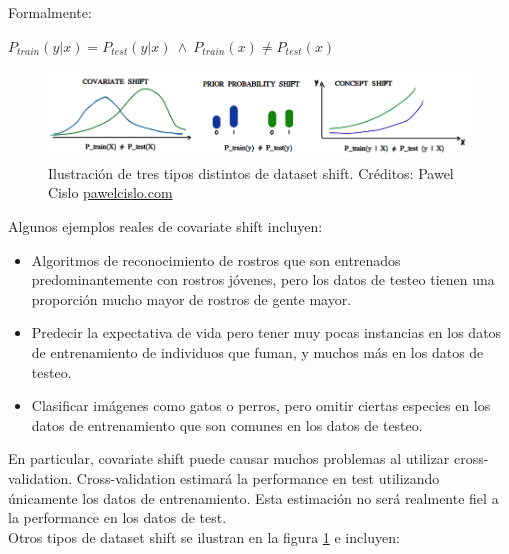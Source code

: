 Formalmente: 

\begin{center}
$ P_{train}(y|x) = P_{test}(y|x) \ \wedge \  P_{train}(x) \neq P_{test}(x)$
\end{center}

\begin{figure}[h!]
\centering
  \includegraphics[width=\textwidth]{Kap8/types_of_drift.png}
\caption{ Ilustración de tres tipos distintos de dataset shift. Créditos: Pawel Cislo \url{pawelcislo.com} }
\label{fig:dataset_shift_types}
\end{figure}

Algunos ejemplos reales de covariate shift incluyen:

\begin{itemize}
\item Algoritmos de reconocimiento de rostros que son entrenados predominantemente con rostros jóvenes, pero los datos de testeo tienen una proporción mucho mayor de rostros de gente mayor.
\item Predecir la expectativa de vida pero tener muy pocas instancias en los datos de entrenamiento de individuos que fuman, y muchos más en los datos de testeo.
\item Clasificar imágenes como gatos o perros, pero omitir ciertas especies en los datos de entrenamiento que son comunes en los datos de testeo.
\end{itemize}

En particular, covariate shift puede causar muchos problemas al utilizar cross-validation. Cross-validation estimará la performance en test utilizando únicamente los datos de entrenamiento. Esta estimación no será realmente fiel a la performance en los datos de test. \cite{LOPEZ20141} \cite{10.5555/1314498.1390324} \\

Otros tipos de dataset shift se ilustran en la figura \ref{fig:dataset_shift_types} e incluyen:

